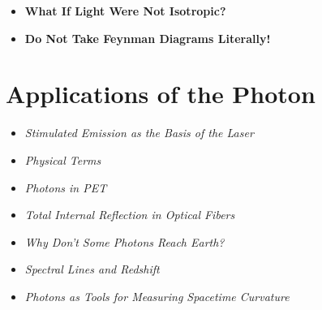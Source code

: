 \vspace{1em}
\begin{tcolorbox}[title=Hypothetical Boxes, hypobox]
	\begin{itemize}
		\item \textbf{What If Light Were Not Isotropic?} \dotfill \pageref{box:was wäre nicht isotop}
	\end{itemize}
\end{tcolorbox}

\vspace{1em}
\begin{tcolorbox}[title=Warning Boxes, warnbox]
	\begin{itemize}
		\item \textbf{Do Not Take Feynman Diagrams Literally!} \dotfill \pageref{box:Warnung}
	\end{itemize}
\end{tcolorbox}


\section{Applications of the Photon}
\vspace{1em}

\begin{tcolorbox}[title=Physical Boxes, physikbox]
	\begin{itemize}
		\item \emph{Stimulated Emission as the Basis of the Laser} \dotfill\pageref{box:grundlagedeslaser}
		\item \emph{Physical Terms} \dotfill\pageref{box:begriffe}
		\item \emph{Photons in PET} \dotfill\pageref{box:PET}
		\item \emph{Total Internal Reflection in Optical Fibers} \dotfill\pageref{box:glasfaser}
		\item \emph{Why Don’t Some Photons Reach Earth?} \dotfill\pageref{box:photonen auf erde}
		\item \emph{Spectral Lines and Redshift} \dotfill\pageref{box:spektrallinien}
		\item \emph{Photons as Tools for Measuring Spacetime Curvature} \dotfill\pageref{box:messwerkzeug}
	\end{itemize}
\end{tcolorbox}


